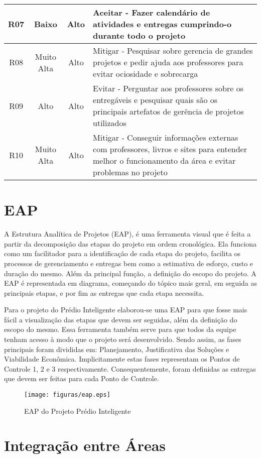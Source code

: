 \begin{table}[!h]
\begin{tabular}{|c|c|c|l|}
    R07                    & Baixo                  & Alto             & \parbox[t]{5cm}{Aceitar - Fazer calendário de atividades e entregas cumprindo-o durante todo o projeto}                                                                                   \\ \hline
    R08                    & Muito Alta             & Alto             & \parbox[t]{5cm}{Mitigar - Pesquisar sobre gerencia de grandes projetos e pedir ajuda aos professores para evitar ociosidade e sobrecarga}                                                 \\ \hline
    R09                    & Alto                   & Alto             & \parbox[t]{5cm}{Evitar - Perguntar aos professores sobre os entregáveis e pesquisar quais são os principais artefatos de gerência de projetos utilizados}                                 \\ \hline
    R10                    & Muito Alta             & Alto             & \parbox[t]{5cm}{Mitigar - Conseguir informações externas com professores, livros e sites para entender melhor o funcionamento da área e evitar problemas no projeto} \\ \hline
  \end{tabular}
\end{table}

\chapter{EAP}
A Estrutura Analítica de Projetos (EAP), é uma ferramenta visual que é feita a partir da decomposição das etapas do projeto em ordem cronológica. Ela funciona como um facilitador para a identificação de cada etapa do projeto, facilita os processos de gerenciamento e entregas bem como a estimativa de esforço, custo e duração do mesmo. Além da principal função, a definição do escopo do projeto. A EAP é representada em diagrama, começando do tópico mais geral, em seguida as principais etapas, e por fim as entregas que cada etapa necessita.

Para o projeto do Prédio Inteligente elaborou-se uma EAP para que fosse mais fácil a visualização das etapas que devem ser seguidas, além da definição do escopo do mesmo. Essa ferramenta também serve para que todos da equipe tenham acesso à modo que o projeto será desenvolvido. Sendo assim, as fases principais foram divididas em: Planejamento, Justificativa das Soluções e Viabilidade Econômica. Implicitamente estas fases representam os Pontos de Controle 1, 2 e 3 respectivamente. Consequentemente, foram definidas as entregas que devem ser feitas para cada Ponto de Controle.
 \begin{figure}[!h]
 	\centering
 	\texttt{[image: figuras/eap.eps]}
 	\caption{EAP do Projeto Prédio Inteligente}
 	\label{fig01}
 \end{figure}

\chapter{Integração entre Áreas}
